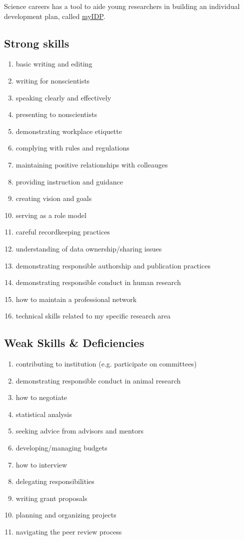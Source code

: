 Science careers has a tool to aide young researchers in building an individual development plan, called
\hyperlink{https://myidp.sciencecareers.org}{myIDP}.

\subsection{Strong skills}
\begin{enumerate}[noitemsep]
    \item basic writing and editing
    \item writing for nonscientists
    \item speaking clearly and effectively
    \item presenting to nonscientists
    \item demonstrating workplace etiquette
    \item complying with rules and regulations
    \item maintaining positive relationships with colleauges
    \item providing instruction and guidance
    \item creating vision and goals
    \item serving as a role model
    \item careful recordkeeping practices
    \item understanding of data ownership/sharing issues
    \item demonstrating responsible authorship and publication practices
    \item demonstrating responsible conduct in human research
    \item how to maintain a professional network
    \item technical skills related to my specific research area
\end{enumerate}


\subsection{Weak Skills \& Deficiencies}

\begin{enumerate}[noitemsep]
    \item contributing to institution (e.g. participate on committees)
    \item demonstrating responsible conduct in animal research
    \item how to negotiate
    \item statistical analysis
    \item seeking advice from advisors and mentors
    \item developing/managing budgets
    \item how to interview
    \item delegating responsibilities
    \item writing grant proposals
    \item planning and organizing projects
    \item navigating the peer review process
\end{enumerate}

